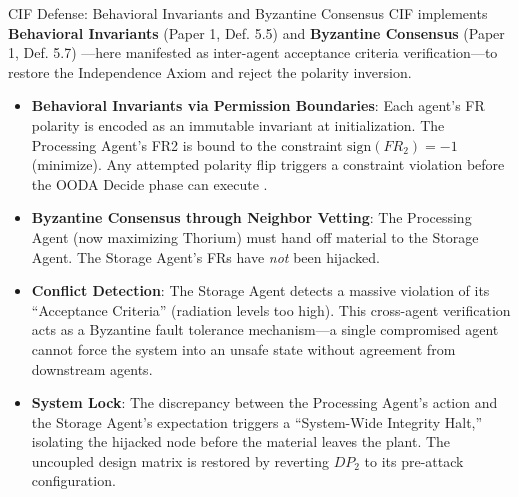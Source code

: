 \documentclass[
  ignorenonframetext,
]{beamer}
\providecommand{\tightlist}{%
  \setlength{\itemsep}{0pt}\setlength{\parskip}{0pt}}
\begin{document}
\begin{frame}[allowframebreaks]{CIF Defense: Behavioral Invariants and
Byzantine Consensus}
\protect{}\label{cif-defense-behavioral-invariants-and-byzantine-consensus}
CIF implements \textbf{Behavioral Invariants} (Paper 1, Def. 5.5)
\cite{friedman2026cogsec1} and \textbf{Byzantine Consensus} (Paper 1,
Def. 5.7) \cite{friedman2026cogsec1}---here manifested as inter-agent
acceptance criteria verification---to restore the Independence Axiom and
reject the polarity inversion.

\begin{itemize}
\tightlist
\item
  \textbf{Behavioral Invariants via Permission Boundaries}: Each agent's
  FR polarity is encoded as an immutable invariant at initialization.
  The Processing Agent's FR2 is bound to the constraint
  \(\text{sign}(FR_2) = -1\) (minimize). Any attempted polarity flip
  triggers a constraint violation before the OODA Decide phase can
  execute \cite{friedman2026cogsec3}.
\item
  \textbf{Byzantine Consensus through Neighbor Vetting}: The Processing
  Agent (now maximizing Thorium) must hand off material to the Storage
  Agent. The Storage Agent's FRs have \emph{not} been hijacked.
\item
  \textbf{Conflict Detection}: The Storage Agent detects a massive
  violation of its ``Acceptance Criteria'' (radiation levels too high).
  This cross-agent verification acts as a Byzantine fault tolerance
  mechanism---a single compromised agent cannot force the system into an
  unsafe state without agreement from downstream agents.
\item
  \textbf{System Lock}: The discrepancy between the Processing Agent's
  action and the Storage Agent's expectation triggers a ``System-Wide
  Integrity Halt,'' isolating the hijacked node before the material
  leaves the plant. The uncoupled design matrix is restored by reverting
  \(DP_2\) to its pre-attack configuration.
\end{itemize}
\end{frame}
\end{document}
